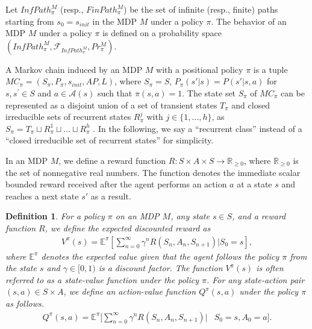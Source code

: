 \documentclass[letterpaper, 10 pt, conference]{ieeeconf}  %
\newtheorem{definition}{Definition}
\begin{document}
Let $InfPath^{M}_{\pi}$ (resp., $FinPath^{M}_{\pi}$) be the set of infinite (resp., finite) paths starting from $s_0=s_{init}$ in the MDP $M$ under a policy $\pi$. The behavior of an MDP $M$ under a policy $\pi$ is defined on a probability space $(InfPath^{M}_{\pi}, \mathcal{F}_{InfPath^{M}_{\pi}}, Pr^{M}_{\pi})$. %

A Markov chain induced by an MDP $M$ with a positional policy $\pi$ is a tuple $MC_{\pi} = (S_{\pi},P_{\pi},s_{init},AP,L)$, where $S_{\pi} = S$, $P_{\pi}(s'|s) = P(s'|s,a)$ for $s, s^{\prime} \in S$ and $a \in \mathcal{A}(s)$ such that $\pi(s,a) = 1$.
The state set $S_{\pi}$ of $MC_{\pi}$ can be represented as a disjoint union of a set of transient states $T_{\pi}$ and closed irreducible sets of recurrent states $R^j_{\pi}$ with $j \in \{ 1, \ldots ,h \}$, as $ S_{\pi} = T_{\pi} \sqcup R^1_{\pi} \sqcup \ldots \sqcup R^h_{\pi} $ \cite{ESS}.
In the following, we say a ``recurrent class'' instead of a ``closed irreducible set of recurrent states'' for simplicity.

In an MDP $M$, we define a reward function $R:S \times A \times S \rightarrow \mathbb{R}_{\geq0}$, where $\mathbb{R}_{\geq0}$ is the set of nonnegative real numbers. The function denotes the immediate scalar bounded reward received after the agent performs an action $a$ at a state $s$ and reaches a next state $s'$ as a result.

\begin{definition}
  For a policy $\pi$ on an MDP $M$, any state $s \in S$, and a reward function $R$, we define the expected discounted reward as
  \begin{align*}
    V^{\pi}(s)= \mathbb{E}^{\pi}[\sum_{n=0}^{\infty}\gamma^n R(S_n, A_n, S_{n+1})|S_0 = s],
  \end{align*}
where $\mathbb{E}^{\pi}$ denotes the expected value given that the agent follows the policy $\pi$ from the state $s$ and $\gamma \in [0,1)$ is a discount factor. The function $V^{\pi}(s)$ is often referred to as a state-value function under the policy $\pi$. For any state-action pair $(s,a) \in S \times A$, we define an action-value function $Q^{\pi}(s,a)$ under the policy $\pi$ as follows.
  \begin{align*}
    Q^{\pi}(s,a)= \mathbb{E}^{\pi}[\sum_{n=0}^{\infty}\gamma^n R(S_n, A_n, S_{n+1})|&S_0 = s, A_0 = a].
  \end{align*}
\end{definition}
\end{document}

